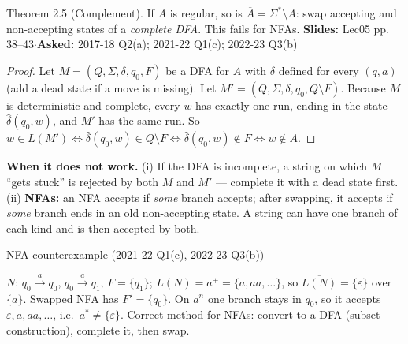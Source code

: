 \documentclass[10.5pt,a4paper]{article}
\newcommand{\src}[2]{{\footnotesize\color{gray!70!black}\textbf{Slides:} #1\enspace$\cdot$\enspace\textbf{Asked:} #2}\par}
\newcommand{\eps}{\varepsilon}
\newcommand{\dhat}{\hat{\delta}}
\begin{document}
\begin{thm}{Theorem 2.5 (Complement). If $A$ is regular, so is $\overline A=\Sigma^*\setminus A$: swap accepting and non-accepting states of a
\emph{complete DFA}. This fails for NFAs.}
\src{Lec05 pp.\,38--43}{2017-18 Q2(a); 2021-22 Q1(c); 2022-23 Q3(b)}
\end{thm}
\begin{proof}
Let $M=(Q,\Sigma,\delta,q_0,F)$ be a DFA for $A$ with $\delta$ defined for every $(q,a)$ (add a dead state if a move is missing). Let
$M'=(Q,\Sigma,\delta,q_0,Q\setminus F)$. Because $M$ is deterministic and complete, every $w$ has exactly one run, ending in the state
$\dhat(q_0,w)$, and $M'$ has the same run. So
$w\in L(M')\iff \dhat(q_0,w)\in Q\setminus F\iff \dhat(q_0,w)\notin F\iff w\notin A$.
\end{proof}
\textbf{When it does not work.} (i) If the DFA is incomplete, a string on which $M$ ``gets stuck'' is rejected by both $M$ and $M'$
--- complete it with a dead state first. (ii) \textbf{NFAs:} an NFA accepts if \emph{some} branch accepts; after swapping, it accepts if
\emph{some} branch ends in an old non-accepting state. A string can have one branch of each kind and is then accepted by both.

\begin{ans}{NFA counterexample (2021-22 Q1(c), 2022-23 Q3(b))}
\begin{minipage}{0.6\linewidth}
$N$: $q_0\xrightarrow{a}q_0$, $q_0\xrightarrow{a}q_1$, $F=\{q_1\}$; $L(N)=a^+=\{a,aa,\dots\}$, so $\overline{L(N)}=\{\eps\}$ over $\{a\}$.
Swapped NFA has $F'=\{q_0\}$. On $a^n$ one branch stays in $q_0$, so it accepts $\eps,a,aa,\dots$, i.e.\ $a^*\ne\{\eps\}$.
Correct method for NFAs: convert to a DFA (subset construction), complete it, then swap.
\end{minipage}\hfill
\begin{minipage}{0.36\linewidth}\centering
{}
\end{minipage}
\end{ans}
\end{document}
